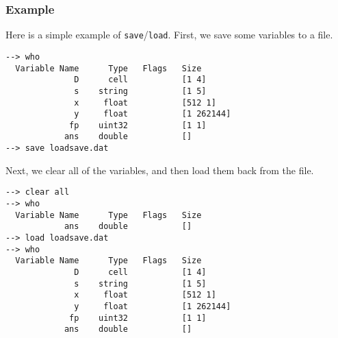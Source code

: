 \subsubsection{Example}
Here is a simple example of \verb|save|/\verb|load|.  First, we save some variables to a file.
\begin{verbatim}
--> who
  Variable Name      Type   Flags   Size
              D      cell           [1 4]
              s    string           [1 5]
              x     float           [512 1]
              y     float           [1 262144]
             fp    uint32           [1 1]
            ans    double           []
--> save loadsave.dat
\end{verbatim}
Next, we clear all of the variables, and then load them back from the file.
\begin{verbatim}
--> clear all
--> who
  Variable Name      Type   Flags   Size
            ans    double           []
--> load loadsave.dat
--> who
  Variable Name      Type   Flags   Size
              D      cell           [1 4]
              s    string           [1 5]
              x     float           [512 1]
              y     float           [1 262144]
             fp    uint32           [1 1]
            ans    double           []
\end{verbatim}


